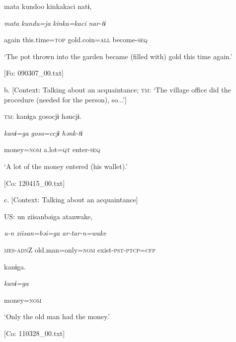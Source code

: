       mata  kundoo  kinkakaci  natɨ,

      \textit{mata}  \textit{kundu=ja}  \textit{kinka=kaci}  \textit{nar-tɨ}

      again  this.time=\textsc{top}  gold.coin=\textsc{all}  become-\textsc{seq}

      ‘The pot thrown into the garden became (filled with) gold this time again.’

      [Fo: 090307\_00.txt]

  b.  [Context: Talking about an acquaintance; \textsc{tm}: ‘The village office did the procedure (needed for the person), so...’]

    \textsc{tm}:  kanɨga  {\textbar}goso{\textbar}cjɨ  həncjɨ.

      \textit{kanɨ=ga}  \textit{goso=ccjɨ}  \textit{hənk-tɨ}

      money=\textsc{nom}  a.lot=\textsc{qt}  enter-\textsc{seq}

      ‘A lot of the money entered (his wallet).’

      [Co: 120415\_00.txt]

  c.  [Context: Talking about an acquaintance]

    US:  un  ziisanbəiga  atanwake,

      \textit{u-n}  \textit{ziisan=bəi=ga}  \textit{ar-tar-n=wake}

      \textsc{mes}-\textsc{adn}Z  old.man=only=\textsc{nom}  exist-\textsc{pst}-\textsc{ptcp}=\textsc{cfp}

      kanɨga.

      \textit{kanɨ=ga}

      money=\textsc{nom}

      ‘Only the old man had the money.’

      [Co: 110328\_00.txt]
